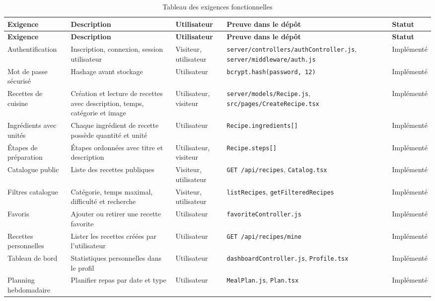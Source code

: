 \documentclass[12pt,a4paper]{report}
\begin{document}
\begin{longtable}{p{2.5cm}p{3.7cm}p{2.3cm}p{3.9cm}p{2cm}}
\caption{Tableau des exigences fonctionnelles}\label{tab:functional}\\
\toprule
\textbf{Exigence} & \textbf{Description} & \textbf{Utilisateur} & \textbf{Preuve dans le dépôt} & \textbf{Statut} \\
\midrule
\endfirsthead
\toprule
\textbf{Exigence} & \textbf{Description} & \textbf{Utilisateur} & \textbf{Preuve dans le dépôt} & \textbf{Statut} \\
\midrule
\endhead
Authentification & Inscription, connexion, session utilisateur & Visiteur, utilisateur & \texttt{server/controllers/authController.js}, \texttt{server/middleware/auth.js} & Implémenté \\
Mot de passe sécurisé & Hashage avant stockage & Utilisateur & \texttt{bcrypt.hash(password, 12)} & Implémenté \\
Recettes de cuisine & Création et lecture de recettes avec description, temps, catégorie et image & Utilisateur, visiteur & \texttt{server/models/Recipe.js}, \texttt{src/pages/CreateRecipe.tsx} & Implémenté \\
Ingrédients avec unités & Chaque ingrédient de recette possède quantité et unité & Utilisateur & \texttt{Recipe.ingredients[]} & Implémenté \\
Étapes de préparation & Étapes ordonnées avec titre et description & Utilisateur, visiteur & \texttt{Recipe.steps[]} & Implémenté \\
Catalogue public & Liste des recettes publiques & Visiteur, utilisateur & \texttt{GET /api/recipes}, \texttt{Catalog.tsx} & Implémenté \\
Filtres catalogue & Catégorie, temps maximal, difficulté et recherche & Visiteur, utilisateur & \texttt{listRecipes}, \texttt{getFilteredRecipes} & Implémenté \\
Favoris & Ajouter ou retirer une recette favorite & Utilisateur & \texttt{favoriteController.js} & Implémenté \\
Recettes personnelles & Lister les recettes créées par l'utilisateur & Utilisateur & \texttt{GET /api/recipes/mine} & Implémenté \\
Tableau de bord & Statistiques personnelles dans le profil & Utilisateur & \texttt{dashboardController.js}, \texttt{Profile.tsx} & Implémenté \\
Planning hebdomadaire & Planifier repas par date et type & Utilisateur & \texttt{MealPlan.js}, \texttt{Plan.tsx} & Implémenté \\

\end{longtable}
\end{document}
